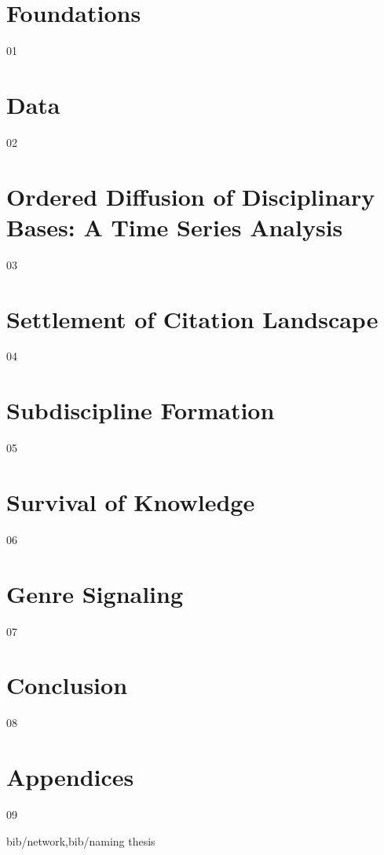 \documentclass [PhD] {uclathes}
\begin{document}
\makeintropages

\chapter{Foundations}
 {01}
\chapter{Data}
 {02}
\chapter{Ordered Diffusion of Disciplinary Bases: A Time Series Analysis}
 {03}
\chapter{Settlement of Citation Landscape}
 {04}
\chapter{Subdiscipline Formation}
 {05}
\chapter{Survival of Knowledge}
 {06}
\chapter{Genre Signaling}
 {07}
\chapter{Conclusion}
 {08}
\chapter{Appendices}
 {09}

 {bib/network,bib/naming}    %
 {thesis}
\end{document}
